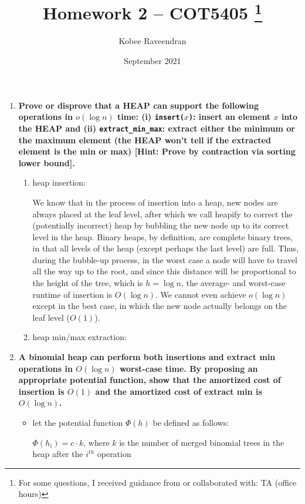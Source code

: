 \documentclass[12pt]{article}
\title{Homework 2 -- COT5405
    \thanks{For some questions, I received guidance from or collaborated with: TA (office hours)}
}
\author{Kobee Raveendran}
\date{September 2021}
\begin{document}
\maketitle

\begin{enumerate}
    \item \textbf{Prove or disprove that a HEAP can support the following operations in $o(\log n)$ time: 
    (i) \texttt{insert($x$)}: insert an element $x$ into the HEAP and (ii) \texttt{extract\_min\_max}: extract either 
    the minimum or the maximum element (the HEAP won't tell if the extracted element is the min 
    or max) [Hint: Prove by contraction via sorting lower bound].}

    \begin{enumerate}
        \item heap insertion:
        
        We know that in the process of insertion into a heap, new nodes are always placed at the leaf level, after 
        which we call heapify to correct the (potentially incorrect) heap by bubbling the new node up to its 
        correct level in the heap. Binary heaps, by definition, are complete binary trees, in that all levels of the 
        heap (except perhaps the last level) are full. Thus, during the bubble-up process, in the worst case a node will 
        have to travel all the way up to the root, and since this distance will be proportional to the height of the tree, 
        which is $h = \log n$, the average- and worst-case runtime of insertion is $O(\log n)$. We cannot even achieve 
        $o(\log n)$ except in the best case, in which the new node actually belongs on the leaf level ($O(1)$).

        \item heap min/max extraction:
    \end{enumerate}

    \item \textbf{A binomial heap can perform both insertions and extract min operations in $O(\log n)$ 
    worst-case time. By proposing an appropriate potential function, show that the amortized 
    cost of insertion is $O(1)$ and the amortized cost of extract min is $O(\log n)$.}

    \begin{itemize}
        \item let the potential function $\Phi(h)$ be defined as follows:
        
        $\Phi(h_i) = c \cdot k$, where $k$ is the number of merged binomial trees in the heap after 
        the $i^{th}$ operation


\end{itemize}
\end{enumerate}
\end{document}
